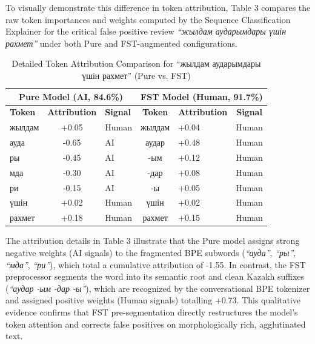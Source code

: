 \documentclass[runningheads]{llncs}
\begin{document}
To visually demonstrate this difference in token attribution, Table 3 compares the raw token importances and weights computed by the Sequence Classification Explainer for the critical false positive review \textit{``жылдам аударымдары үшін рахмет''} under both Pure and FST-augmented configurations.
\begin{table}
\caption{Detailed Token Attribution Comparison for ``жылдам аударымдары үшін рахмет'' (Pure vs. FST)}
\label{tab:table3}
\centering
\footnotesize
\begin{tabular}{lclclc}
\toprule
\multicolumn{3}{c}{Pure Model (AI, 84.6\%)} & \multicolumn{3}{c}{FST Model (Human, 91.7\%)} \\
\midrule
\textbf{Token} & \textbf{Attribution} & \textbf{Signal} & \textbf{Token} & \textbf{Attribution} & \textbf{Signal} \\
жылдам & +0.05 & Human & жылдам & +0.04 & Human \\
ауда & -0.65 & AI & аудар & +0.48 & Human \\
ры & -0.45 & AI & -ым & +0.12 & Human \\
мда & -0.30 & AI & -дар & +0.08 & Human \\
ри & -0.15 & AI & -ы & +0.05 & Human \\
үшін & +0.02 & Human & үшін & +0.02 & Human \\
рахмет & +0.18 & Human & рахмет & +0.15 & Human \\
\bottomrule
\end{tabular}
\end{table}

The attribution details in Table 3 illustrate that the Pure model assigns strong negative weights (AI signals) to the fragmented BPE subwords (\textit{``ауда''}, \textit{``ры''}, \textit{``мда''}, \textit{``ри''}), which total a cumulative attribution of -1.55. In contrast, the FST preprocessor segments the word into its semantic root and clean Kazakh suffixes (\textit{``аудар -ым -дар -ы''}), which are recognized by the conversational BPE tokenizer and assigned positive weights (Human signals) totalling +0.73. This qualitative evidence confirms that FST pre-segmentation directly restructures the model's token attention and corrects false positives on morphologically rich, agglutinated text.
\end{document}
